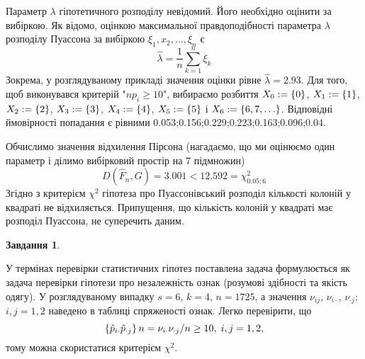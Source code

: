 \documentclass[12pt]{article} %
\newtheorem{prob}{Завдання}
\begin{document}
	Параметр $\lambda$ гіпотетичного розподілу невідомий. Його необхідно оцінити за вибіркою. Як відомо, оцінкою максимальної правдоподібності
	параметра $\lambda$ розподілу Пуассона за вибіркою $\xi_1,x_2,\hdots,\xi_n$ є
	\[\hat{\lambda}=\frac{1}{n}\sum_{k=1}^n\xi_k\]
	Зокрема, у розглядуваному прикладі значення оцінки рівне $\hat{\lambda}=2.93$. Для того, щоб виконувався критерій "$np_i\geq10$",
	вибираємо розбиття $X_0:=\left\{0\right\}$, $X_1:=\left\{1\right\}$, $X_2:=\left\{2\right\}$,
	$X_3:=\left\{3\right\}$, $X_4:=\left\{4\right\}$, $X_5:=\left\{5\right\}$ і $X_6:=\left\{6,7,\hdots\right\}$.
	Відповідні ймовірності попадання є рівними 0.053;0.156;0.229;0.223;0.163;0.096;0.04.

	Обчислимо значення відхилення Пірсона (нагадаємо, що ми оцінюємо один параметр і ділимо вибірковий простір на 7 підмножин)
	\[D(\hat{F}_n,G)=3.001<12.592=\chi^2_{0.05;6}\]
	Згідно з критерієм $\chi^2$ гіпотеза про Пуассонівський розподіл кількості колоній у квадраті не відхиляється. Припущення,
	що кількість колоній у квадраті має розподіл Пуассона, не суперечить даним.
\begin{prob}\end{prob}%
	У термінах перевірки статистичних гіпотез поставлена задача формулюється як задача перевірки гіпотези про незалежність ознак
	(розумові здібності та якість одягу). У розглядуваному випадку $s=6$, $k=4$, $n=1725$, а значення $\nu_{ij}$, $\nu_{i\cdot}$,
	$\nu_{\cdot j}$; $i,j=1,2$ наведено в таблиці спряженості ознак. Легко перевірити, що
	\[\left\{\hat{p}_{i\cdot}\hat{p}_{\cdot j}\right\}n=\nu_{i\cdot}\nu_{\cdot j}/n\geq10,\;i,j=1,2,\]
	тому можна скористатися критерієм $\chi^2$. 
	
\end{document}

